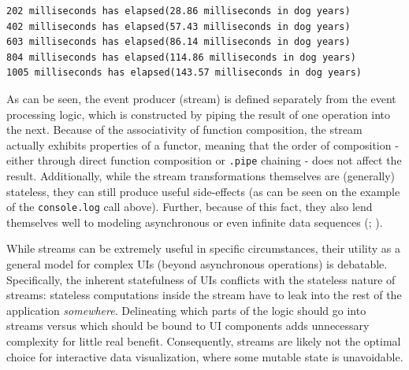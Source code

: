 \documentclass[
  openany]{book}
\newenvironment{Shaded}{\begin{snugshade}}{\end{snugshade}}
\newcommand{\BuiltInTok}[1]{#1}
\newcommand{\DecValTok}[1]{\textcolor[rgb]{0.00,0.00,0.81}{#1}}
\newcommand{\FunctionTok}[1]{\textcolor[rgb]{0.13,0.29,0.53}{\textbf{#1}}}
\newcommand{\KeywordTok}[1]{\textcolor[rgb]{0.13,0.29,0.53}{\textbf{#1}}}
\newcommand{\NormalTok}[1]{#1}
\newcommand{\OperatorTok}[1]{\textcolor[rgb]{0.81,0.36,0.00}{\textbf{#1}}}
\newcommand{\SpecialCharTok}[1]{\textcolor[rgb]{0.81,0.36,0.00}{\textbf{#1}}}
\newcommand{\VerbatimStringTok}[1]{\textcolor[rgb]{0.31,0.60,0.02}{#1}}
\theoremstyle{definition}
\theoremstyle{definition}
\theoremstyle{definition}
\theoremstyle{definition}
\theoremstyle{remark}
\begin{document}
\begin{Shaded}
\end{Shaded}

\begin{verbatim}
202 milliseconds has elapsed(28.86 milliseconds in dog years)
402 milliseconds has elapsed(57.43 milliseconds in dog years)
603 milliseconds has elapsed(86.14 milliseconds in dog years)
804 milliseconds has elapsed(114.86 milliseconds in dog years)
1005 milliseconds has elapsed(143.57 milliseconds in dog years)
\end{verbatim}

As can be seen, the event producer (stream) is defined separately from the event processing logic, which is constructed by piping the result of one operation into the next. Because of the associativity of function composition, the stream actually exhibits properties of a functor, meaning that the order of composition - either through direct function composition or \texttt{.pipe} chaining - does not affect the result. Additionally, while the stream transformations themselves are (generally) stateless, they can still produce useful side-effects (as can be seen on the example of the \texttt{console.log} call above). Further, because of this fact, they also lend themselves well to modeling asynchronous or even infinite data sequences (; ).

While streams can be extremely useful in specific circumstances, their utility as a general model for complex UIs (beyond asynchronous operations) is debatable. Specifically, the inherent statefulness of UIs conflicts with the stateless nature of streams: stateless computations inside the stream have to leak into the rest of the application \emph{somewhere}. Delineating which parts of the logic should go into streams versus which should be bound to UI components adds unnecessary complexity for little real benefit. Consequently, streams are likely not the optimal choice for interactive data visualization, where some mutable state is unavoidable.
\end{document}
